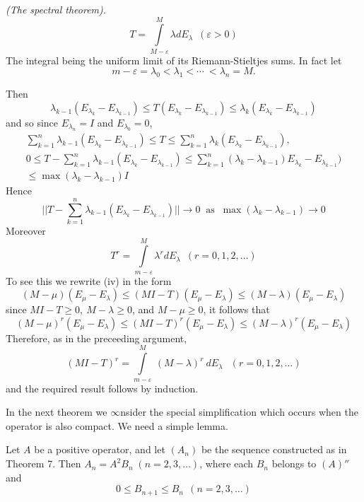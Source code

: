 \begin{coro*}{\em(The spectral theorem).}
  $$
  T= \int \limits^{M}_{M- \varepsilon} \lambda d E_\lambda \; ~ (
  \varepsilon > 0) 
  $$ 
  The integral being the uniform limit of its Riemann-Stieltjes
  sums. In fact let 
  $$
  m - \varepsilon = \lambda_0 < \lambda_1 < \cdots ~ < \lambda_n = M.
  $$\pageoriginale
\end{coro*}

Then
$$
\lambda_{k-1} ( E_{\lambda_{k}} -E_{\lambda_{k-1}} ) \leq T	 (
E_{\lambda_{k}} - E_{\lambda_{k-1}} ) \leq \lambda_k (E_{\lambda_{k}}
- E_{\lambda_{k-1}}) 
$$
and so since $E_{\lambda_{n}} = I$ and $E_{\lambda_{0}} = 0$,
\begin{gather*}
  \sum^{n}_{k=1} \lambda_{k-1} ( E_{\lambda_{k}} - E_{\lambda_{k-1}} )
  \leq T  \leq \sum^{n}_{k=1} \lambda_k (E_{\lambda_{k}}
  -E_{\lambda_{k-1}}), \\ 
  0 \leq T - \sum^{n}_{k=1} \lambda_{k-1} (E_{\lambda_{k}}
  -E_{\lambda_{k-1}}) \leq \sum^{n}_{k=1} (\lambda_k - \lambda_{k-1})
  E_{\lambda_{k}} -E_{\lambda_{k-1}} ) \\ 
  \leq \max (\lambda_k -\lambda_{k-1}) I 
 \end{gather*} 
Hence 
$$
|| T - \sum^{n}_{k=1} \lambda_{k-1} (E_{\lambda_{k}} -
E_{\lambda_{k-1}}) || \to 0 ~\text{ as }~ \max (\lambda_k
-\lambda_{k-1}) \to 0  
$$
Moreover 
$$
T^r = \int \limits^{M}_{m- \varepsilon} \lambda^r d E_\lambda ~ \; (r=0,1,2,
\ldots) 
$$
To see this we rewrite (iv) in the form
$$
(M-\mu) (E_\mu - E_\lambda ) \leq (MI- T) (E_\mu - E_\lambda ) \leq
(M-\lambda) (E_\mu - E_\lambda) 
$$
since $MI - T \ge 0, ~ M - \lambda \ge 0$, and $M- \mu \ge 0$, it
follows that  
$$
(M-\mu)^r(E_\mu -E_\lambda) \leq (MI -T)^r (E_\mu - E_\lambda)  
 \leq (M-\lambda)^r  (E_\mu -E_\lambda) 
$$\pageoriginale
Therefore, as in the preceeding argument,
$$
(MI -T)^r = \int \limits^{M}_{m- \varepsilon} ~ (M- \lambda)^r
~dE_\lambda ~ ~ \; (r=0,1,2,\ldots) 
$$
and the required result follows by induction.

In the next theorem we $\infty$nsider the special simplification which
occurs when the operator is also compact. We need a simple lemma. 

\begin{lemma} %
  Let $A$ be a positive operator, and let $(A_n)$ be the sequence
  constructed as in Theorem 7. Then $A_n = A^2 B_n \; (n=2,3,\ldots)$,
  where each $B_n$ belongs to $(A)''$ and  
  $$
  0 \leq B_{n+1} \leq B_n ~ ~ (n=2,3,\ldots)
  $$
\end{lemma}

